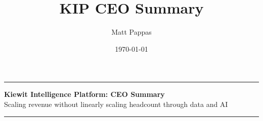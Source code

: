 \documentclass[10pt, a4paper]{article}
\title{KIP CEO Summary}
\author{Matt Pappas}
\date{\today}
\begin{document}
\pagestyle{plain}
\renewcommand{\thepage}{\arabic{page}}
\thispagestyle{plain}

\begin{center}
    \noindent\rule{\linewidth}{1.5pt}
    
    \vspace{0.05em}
    
    {\large \textbf{Kiewit Intelligence Platform: CEO Summary}} \\[0.05em]
    {\footnotesize Scaling revenue without linearly scaling headcount through data and AI}
    
    \vspace{0.05em}
    
    \noindent\rule{\linewidth}{1.5pt}
\end{center}

\vspace{0.1em}

\end{document}
